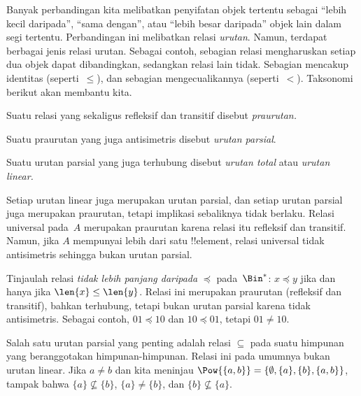 \documentclass[../../../include/open-logic-section]{subfiles}
\begin{document}

\begin{explain}
Banyak perbandingan kita melibatkan penyifatan objek tertentu sebagai
``lebih kecil daripada'', ``sama dengan'', atau ``lebih besar daripada'' objek
lain dalam segi tertentu. Perbandingan ini melibatkan relasi \emph{urutan}.
Namun, terdapat berbagai jenis relasi urutan. Sebagai contoh, sebagian relasi
mengharuskan setiap dua objek dapat dibandingkan, sedangkan relasi lain tidak.
Sebagian mencakup identitas (seperti~$\le$), dan sebagian mengecualikannya
(seperti~$<$). Taksonomi berikut akan membantu kita.
\end{explain}

\begin{defn}[Praurutan]
Suatu relasi yang sekaligus refleksif dan transitif disebut
\emph{praurutan.}
\end{defn}

\begin{defn}
Suatu praurutan yang juga antisimetris disebut \emph{urutan parsial}.
\end{defn}

\begin{defn}
Suatu urutan parsial yang juga terhubung disebut \emph{urutan total} atau
\emph{urutan linear.}
\end{defn}

\begin{ex}
Setiap urutan linear juga merupakan urutan parsial, dan setiap urutan parsial
juga merupakan praurutan, tetapi implikasi sebaliknya tidak berlaku. Relasi
universal pada~$A$ merupakan praurutan karena relasi itu refleksif dan
transitif. Namun, jika $A$ mempunyai lebih dari satu !!{element}, relasi
universal tidak antisimetris sehingga bukan urutan parsial.
\end{ex}

\begin{ex}
Tinjaulah relasi \emph{tidak lebih panjang daripada} $\preccurlyeq$
pada~$\Bin^*$: $x \preccurlyeq y$ jika dan hanya jika $\len{x} \le \len{y}$.
Relasi ini merupakan praurutan (refleksif dan transitif), bahkan terhubung,
tetapi bukan urutan parsial karena tidak antisimetris. Sebagai contoh,
$01 \preccurlyeq 10$ dan $10 \preccurlyeq 01$, tetapi $01 \neq 10$.
\end{ex}

\begin{ex}
Salah satu urutan parsial yang penting adalah relasi $\subseteq$ pada suatu
himpunan yang beranggotakan himpunan-himpunan. Relasi ini pada umumnya bukan
urutan linear. Jika $a \neq b$ dan kita meninjau
$\Pow{\{a, b\}} = \{\emptyset, \{a\}, \{b\}, \{a,b\}\}$, tampak bahwa
$\{a\} \nsubseteq \{b\}$, $\{a\} \neq \{b\}$, dan
$\{b\} \nsubseteq \{a\}$.
\end{ex}
\end{document}
